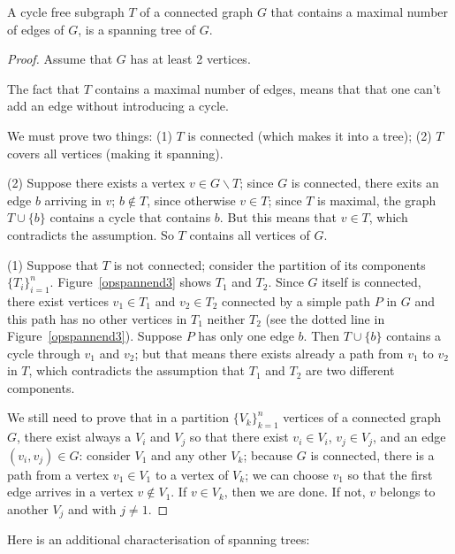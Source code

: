 \begin{theorem}\label{opspannend4}
A cycle free subgraph $T$ of a connected graph $G$ that contains a
maximal number of edges of $G$, is a spanning tree of $G$.
\end{theorem}
\begin{proof}

Assume that $G$ has at least 2 vertices.

The fact that $T$ contains a maximal number of edges, means that
that one can't add an edge without introducing a cycle.

We must prove two things: (1) $T$ is connected (which makes it into a
tree); (2) $T$ covers all vertices (making it spanning).


(2) Suppose there exists a vertex $v \in G \backslash T$; since $G$ is
connected, there exits an edge $b$ arriving in $v$; $b \notin T$,
since otherwise $v \in T$; since $T$ is maximal, the graph $T \cup
\{b\}$ contains a cycle that contains $b$. But this means that $v \in
T$, which contradicts the assumption. So $T$ contains all vertices of
$G$.

(1) Suppose that $T$ is not connected; consider the partition of its
components $\{T_{i}\}_{i=1}^{n}$. Figure~\ref{opspannend3} shows
$T_{1}$ and $T_{2}$. Since $G$ itself is connected, there exist
vertices $v_{1} \in T_{1}$ and $v_{2} \in T_{2}$ connected by a simple
path $P$ in $G$ and this path has no other vertices in $T_{1}$ neither
$T_{2}$ (see the dotted line in Figure~\ref{opspannend3}). Suppose $P$
has only one edge $b$. Then $T \cup \{b\}$ contains a cycle through
$v_{1}$ and $v_{2}$; but that means there exists already a path from
$v_{1}$ to $v_{2}$ in $T$, which contradicts the assumption that
$T_{1}$ and $T_{2}$ are two different components.

We still need to prove that in a partition $\{V_{k}\}_{k=1}^{n}$
vertices of a connected graph $G$, there exist always a $V_{i}$ and
$V_{j}$ so that there exist $v_{i} \in V_{i}$, $v_{j} \in V_{j}$, and
an edge $(v_{i},v_{j}) \in G$: consider $V_{1}$ and any other $V_{k}$;
because $G$ is connected, there is a path from a vertex $v_{1} \in
V_{1}$ to a vertex of $V_{k}$; we can choose $v_{1}$ so that the first
edge arrives in a vertex $v \notin V_{1}$. If $v \in V_{k}$, then we
are done. If not, $v$ belongs to another $V_{j}$ and with $j \neq 1$.
\end{proof}


Here is an additional characterisation of spanning trees:

